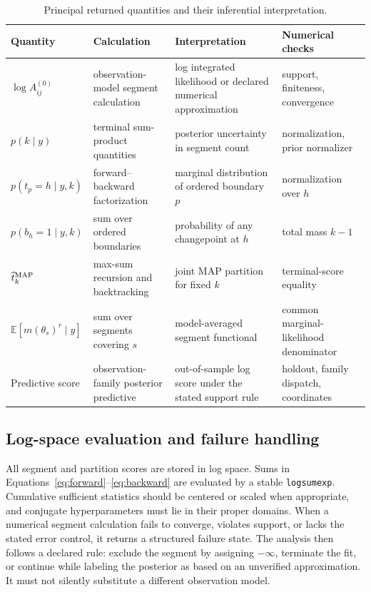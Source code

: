 \begin{table}[t]
\centering
\small
\caption{Principal returned quantities and their inferential interpretation.}
\label{tab:exported-objects}
\begin{tabularx}{0.96\textwidth}{@{}L{0.19\textwidth}L{0.22\textwidth}Y L{0.18\textwidth}@{}}
\toprule
Quantity & Calculation & Interpretation & Numerical checks \\
\midrule
$\log A^{(0)}_{ij}$ & observation-model segment calculation & log integrated likelihood or declared numerical approximation & support, finiteness, convergence \\
$p(k\mid y)$ & terminal sum-product quantities & posterior uncertainty in segment count & normalization, prior normalizer \\
$p(t_p=h\mid y,k)$ & forward--backward factorization & marginal distribution of ordered boundary $p$ & normalization over $h$ \\
$p(b_h=1\mid y,k)$ & sum over ordered boundaries & probability of any changepoint at $h$ & total mass $k-1$ \\
$\widehat t^{\rm MAP}_k$ & max-sum recursion and backtracking & joint MAP partition for fixed $k$ & terminal-score equality \\
$\mathbb E[m(\theta_s)^r\mid y]$ & sum over segments covering $s$ & model-averaged segment functional & common marginal-likelihood denominator \\
Predictive score & observation-family posterior predictive & out-of-sample log score under the stated support rule & holdout, family dispatch, coordinates \\
\bottomrule
\end{tabularx}
\end{table}

\subsection{Log-space evaluation and failure handling}
All segment and partition scores are stored in log space. Sums in Equations~\eqref{eq:forward}--\eqref{eq:backward} are evaluated by a stable \texttt{logsumexp}. Cumulative sufficient statistics should be centered or scaled when appropriate, and conjugate hyperparameters must lie in their proper domains. When a numerical segment calculation fails to converge, violates support, or lacks the stated error control, it returns a structured failure state. The analysis then follows a declared rule: exclude the segment by assigning $-\infty$, terminate the fit, or continue while labeling the posterior as based on an unverified approximation. It must not silently substitute a different observation model.

